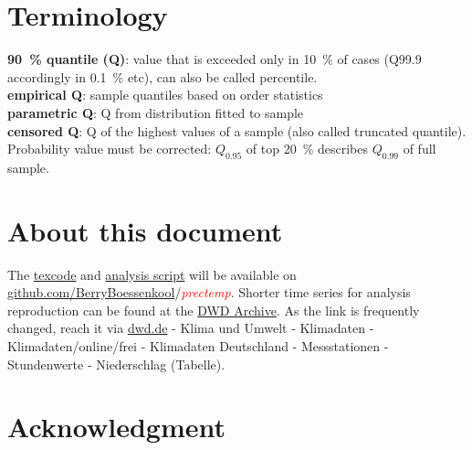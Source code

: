 \documentclass[a4paper]{article}
\newcommand{\todo}[1]{\emph{\textcolor{red}{#1}}}
\begin{document}
\begin{multicols}{2}
\section*{Terminology}

\textbf{90~\% quantile (Q)}: value that is exceeded only in 10~\% of cases (Q99.9 accordingly in 0.1~\% etc), can also be called percentile.\\
\textbf{empirical Q}:  sample quantiles based on order statistics\\
\textbf{parametric Q}: Q from distribution fitted to sample\\
\textbf{censored Q}: Q of the highest values of a sample (also called truncated quantile). Probability value must be corrected: $Q_{0.95}$ of top 20~\% describes $Q_{0.99}$ of full sample.

\section*{About this document}
The \href{https://dl.dropboxusercontent.com/u/4836866/PrecTempPotsdam/0_PrecTempPotsdam.tex}{texcode} and \href{https://dl.dropboxusercontent.com/u/4836866/PrecTempPotsdam/1_PrecTemp-Potsdam.R}{analysis script} will be available on \href{https://github.com/BerryBoessenkool}{github.com/BerryBoessenkool}/\todo{prectemp}.
Shorter time series for analysis reproduction can be found at the \href{http://www.dwd.de/bvbw/appmanager/bvbw/dwdwwwDesktop?_nfpb=true&_pageLabel=_dwdwww_klima_umwelt_klimadaten_deutschland&T82002gsbDocumentPath=Navigation\%2FOeffentlichkeit\%2FKlima__Umwelt\%2FKlimadaten\%2Fkldaten__kostenfrei\%2Fausgabe__stundenwerte__node.html\%3F__nnn\%3Dtrue}{DWD Archive}. As the link is frequently changed, reach it via \href{http://www.dwd.de}{dwd.de} - Klima und Umwelt - Klimadaten - Klimadaten/online/frei - Klimadaten Deutschland - Messstationen - Stundenwerte - Niederschlag (Tabelle).



\section*{Acknowledgment}


\end{multicols}
\end{document}
